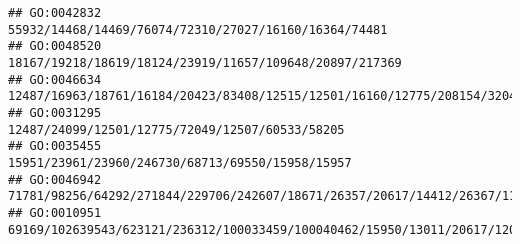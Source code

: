\documentclass[
]{article}
\begin{document}
\begin{verbatim}
## GO:0042832                                                                                                                                                                                                                                                                                                                                                        55932/14468/14469/76074/72310/27027/16160/16364/74481
## GO:0048520                                                                                                                                                                                                                                                                                                                                                      18167/19218/18619/18124/23919/11657/109648/20897/217369
## GO:0046634                                                                                                                                                                                                                                                                                                                  12487/16963/18761/16184/20423/83408/12515/12501/16160/12775/208154/320484/60533/20371/16186
## GO:0031295                                                                                                                                                                                                                                                                                                                                                              12487/24099/12501/12775/72049/12507/60533/58205
## GO:0035455                                                                                                                                                                                                                                                                                                                                                             15951/23961/23960/246730/68713/69550/15958/15957
## GO:0046942                                                                                                                                                                                                                               71781/98256/64292/271844/229706/242607/18671/26357/20617/14412/26367/11833/11988/382044/104158/13897/102680/216225/16204/20500/18126/76408/50934/21943/69354/20519/24115/12780
## GO:0010951                                                                                                                                                                                                                                                                                          69169/102639543/623121/236312/100033459/100040462/15950/13011/20617/12047/20701/20704/71907/15160/20861/20862/15511

\end{verbatim}
\end{document}
